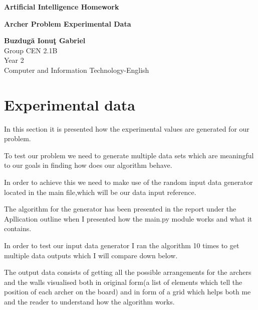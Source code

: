 \documentclass{article}
\begin{document}
\graphicspath{ {./images/} } 
\begin{titlepage}
 
   \begin{center}
   
       \vspace*{1cm}
       \Huge
       \textbf{Artificial Intelligence Homework} \vspace{1 cm}
       
       \textbf{Archer Problem Experimental Data}
            
       \vspace{1 cm}
      \LARGE
       \textbf{Buzdug\u{a} Ionu\c{t} Gabriel}\\
       Group CEN 2.1B\\
       Year 2\\
       Computer and Information Technology-English
       \vfill
            
      
            
       \vspace{0.8cm}
      
    
    \end{center}
  \end{titlepage}
\newpage


\section{Experimental data}
\Large
\vspace*{1cm}
\LARGE
\par In this section it is presented how the experimental values are generated
for our problem.
\par To test our problem we need to generate multiple data sets which are meaningful to our goals in finding how does our algorithm behave.
\par In order to achieve this we need to make use of the random input data generator located in the main file,which will be our data input reference.
\par The algorithm for the generator has been presented in the report under the Apllication outline when I presented how the main.py module works and what it contains.
\par In order to test our input data generator I ran the algorithm 10 times to get multiple data outputs which I will compare down below.
\par The output data consists of getting all the possible  arrangements for the archers and the walls visualised both in original form(a list of elements which tell the position of each archer on the board) and in form of a grid which helps both me and the reader to understand how the algorithm works.
\newpage
\end{document}
